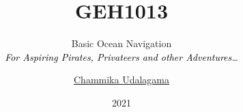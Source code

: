 

\renewcommand\howTitle[3]{
	\title[GEH1013]{\large \bfseries \color{black}GEH1013\\\medskip}
	\subtitle{{{\fontsize{30}{150}\selectfont #1}}\\\smallskip \textcolor{black}{\itshape \small #2}}
	\author[Chammika Udalagama]{\scriptsize \href{mailto:chammika@nus.edu.sg}{\textcolor{green!50!black}{Chammika Udalagama}}
	}
	\date{2021}

	\addtocounter{framenumber}{-3}
}





\howTitle{Basic Ocean Navigation}{For Aspiring Pirates, Privateers and other Adventures\ldots}{Guest Lecture}


%

{
	\begin{frame}
\end{frame}
}

